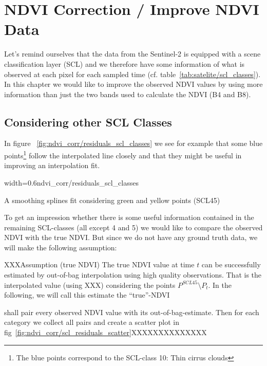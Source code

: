 \chapter{NDVI Correction / Improve NDVI Data}

{
    Let's remind ourselves that the data from the Sentinel-2 is equipped with a scene classification layer (SCL) and we therefore have some information of what is observed at each pixel for each sampled time (cf. table~\ref{tab:satelite/scl_classes}). In this chapter we would like to improve the observed NDVI values by using more information than just the two bands used to calculate the NDVI (B4 and B8).
}

\section{Considering other SCL Classes}{
    In figure ~\ref{fig:ndvi_corr/residuals_scl_classes} we see for example that some blue points\footnote{The blue points correspond to the SCL-class 10: Thin cirrus clouds} follow the interpolated line closely and that they might be useful in improving an interpolation fit.

    \begin{my_figure}[ht]{width=0.6\textwidth}{ndvi_corr/residuals_scl_classes}
        \caption{A smoothing splines fit considering green and yellow points (SCL45)}
        \label{fig:ndvi_corr/residuals_scl_classes}
    \end{my_figure}

    To get an impression whether there is some useful information contained in the remaining SCL-classes (all except 4 and 5) we would like to compare the observed NDVI with the true NDVI. But since we do not have any ground truth data, we will make the following assumption:


    \begin{definition}{XXXAssumption (true NDVI)}
        \label{true_ndvi_assumption}
        The true NDVI value at time $t$ can be successfully estimated by out-of-bag interpolation using high quality observations. That is the interpolated value (using XXX) considering the points $P^{SCL45}\setminus P_t$. In the following, we will call this estimate the ``true''-NDVI
    \end{definition}

    shall pair every observed NDVI value with its out-of-bag-estimate. Then for each category we collect all pairs and create a scatter plot in fig~\ref{fig:ndvi_corr/scl_residuals_scatter}XXXXXXXXXXXXXX



}

